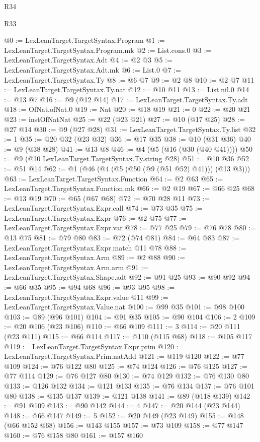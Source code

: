 \begin{lexlean}{R34}
\begin{lexlean}{R33}
\begin{coremodule}
{{{{{{{{{{{{{{{{{{{{{@0 := LexLeanTarget.TargetSyntax.Program
@1 := LexLeanTarget.TargetSyntax.Program.mk
@2 := List.cons.{0}
@3 := LexLeanTarget.TargetSyntax.Adt
@4 := @2 @3
@5 := LexLeanTarget.TargetSyntax.Adt.mk
@6 := List.{0}
@7 := LexLeanTarget.TargetSyntax.Ty
@8 := @6 @7
@9 := @2 @8
@10 := @2 @7
@11 := LexLeanTarget.TargetSyntax.Ty.nat
@12 := @10 @11
@13 := List.nil.{0}
@14 := @13 @7
@16 := @9 (@12 @14)
@17 := LexLeanTarget.TargetSyntax.Ty.adt
@18 := OfNat.ofNat.{0}
@19 := Nat
@20 := @18 @19
@21 := 0
@22 := @20 @21
@23 := instOfNatNat
@25 := @22 (@23 @21)
@27 := @10 (@17 @25)
@28 := @27 @14
@30 := @9 (@27 @28)
@31 := LexLeanTarget.TargetSyntax.Ty.list
@32 := 1
@35 := @20 @32 (@23 @32)
@36 := @17 @35
@38 := @10 (@31 @36)
@40 := @9 (@38 @28)
@41 := @13 @8
@46 := @4 (@5 (@16 (@30 (@40 @41))))
@50 := @9 (@10 LexLeanTarget.TargetSyntax.Ty.string @28)
@51 := @10 @36
@52 := @51 @14
@62 := @1 (@46 (@4 (@5 (@50 (@9 (@51 @52) @41))) (@13 @3)))
@63 := LexLeanTarget.TargetSyntax.Function
@64 := @2 @63
@65 := LexLeanTarget.TargetSyntax.Function.mk
@66 := @2 @19
@67 := @66 @25
@68 := @13 @19
@70 := @65 (@67 @68)
@72 := @70 @28 @11
@73 := LexLeanTarget.TargetSyntax.Expr.call
@74 := @73 @35
@75 := LexLeanTarget.TargetSyntax.Expr
@76 := @2 @75
@77 := LexLeanTarget.TargetSyntax.Expr.var
@78 := @77 @25
@79 := @76 @78
@80 := @13 @75
@81 := @79 @80
@83 := @72 (@74 @81)
@84 := @64 @83
@87 := LexLeanTarget.TargetSyntax.Expr.match @11 @78
@88 := LexLeanTarget.TargetSyntax.Arm
@89 := @2 @88
@90 := LexLeanTarget.TargetSyntax.Arm.arm
@91 := LexLeanTarget.TargetSyntax.Shape.adt
@92 := @91 @25
@93 := @90 @92
@94 := @66 @35
@95 := @94 @68
@96 := @93 @95
@98 := LexLeanTarget.TargetSyntax.Expr.value @11
@99 := LexLeanTarget.TargetSyntax.Value.nat
@100 := @99 @35
@101 := @98 @100
@103 := @89 (@96 @101)
@104 := @91 @35
@105 := @90 @104
@106 := 2
@109 := @20 @106 (@23 @106)
@110 := @66 @109
@111 := 3
@114 := @20 @111 (@23 @111)
@115 := @66 @114
@117 := @110 (@115 @68)
@118 := @105 @117
@119 := LexLeanTarget.TargetSyntax.Expr.prim
@120 := LexLeanTarget.TargetSyntax.Prim.natAdd
@121 := @119 @120
@122 := @77 @109
@124 := @76 @122 @80
@125 := @74 @124
@126 := @76 @125
@127 := @77 @114
@129 := @76 @127 @80
@130 := @74 @129
@132 := @76 @130 @80
@133 := @126 @132
@134 := @121 @133
@135 := @76 @134
@137 := @76 @101 @80
@138 := @135 @137
@139 := @121 @138
@141 := @89 (@118 @139)
@142 := @91 @109
@143 := @90 @142
@144 := 4
@147 := @20 @144 (@23 @144)
@148 := @66 @147
@149 := 5
@152 := @20 @149 (@23 @149)
@155 := @148 (@66 @152 @68)
@156 := @143 @155
@157 := @73 @109
@158 := @77 @147
@160 := @76 @158 @80
@161 := @157 @160
}}}}}}}}}}}}}}}}}}}}}
\end{coremodule}
\end{lexlean}
\end{lexlean}
